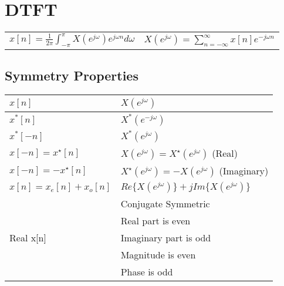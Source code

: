 \documentclass{article}
\begin{document}
\section*{DTFT}
\begin{center}
    \begin{tabularx}{\textwidth - 1in}{XX}
        $x[n] = \frac{1}{2\pi}\int_{-\pi}^{\pi}{X(e^{j\omega})e^{j\omega n}d\omega}$ & $X(e^{j\omega}) = \sum_{n=-\infty}^{\infty}{x[n]e^{-j\omega n}}$
    \end{tabularx}
\end{center}
\subsection*{Symmetry Properties}
\begin{center}
    \begin{tabularx}{\textwidth}{XX}
        \hline
        $x[n]$ & $X(e^{j\omega})$\\
        \hline
        $x^*[n]$ & $X^*(e^{-j\omega})$\\
        $x^*[-n]$ & $X^*(e^{j\omega})$\\
        $x[-n]=x^{\star}[n]$ & $X(e^{j\omega})=X^\star(e^{j\omega})$ (Real)\\
        $x[-n]=-x^{\star}[n]$ & $X^\star(e^{j\omega})=-X(e^{j\omega})$ (Imaginary)\\
        $x[n]=x_e[n]+x_o[n]$ & $Re\{X(e^{j\omega})\}+jIm\{X(e^{j\omega})\}$\\
        \hline
         & Conjugate Symmetric\\
         & Real part is even\\
         Real x[n] & Imaginary part is odd\\
         & Magnitude is even\\
         & Phase is odd\\
    \end{tabularx}
\end{center}
\end{document}
